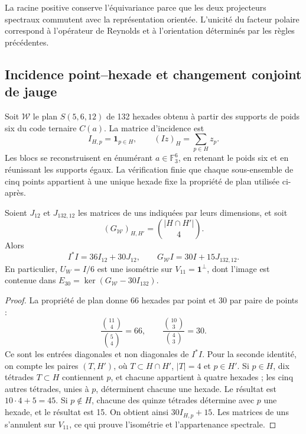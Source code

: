La racine positive conserve l’équivariance parce que les deux projecteurs
spectraux commutent avec la représentation orientée. L’unicité du
facteur polaire correspond à l’opérateur de Reynolds et à l’orientation
déterminés par les règles précédentes.

\subsection{Incidence point--hexade et changement conjoint de jauge}

Soit \(\mathcal W\) le plan \(S(5,6,12)\) de 132 hexades obtenu
à partir des supports de poids six du code ternaire \(C(a)\). La matrice
d’incidence est
\[
 I_{H,p}=\mathbf1_{p\in H},\qquad
 (Iz)_H=\sum_{p\in H}z_p.
\]
Les blocs se reconstruisent en énumérant \(a\in\mathbb F_3^6\),
en retenant le poids six et en réunissant les supports égaux. La vérification
finie que chaque sous-ensemble de cinq points appartient à une unique
hexade fixe la propriété de plan utilisée ci-après.

\begin{lemma}
\label{ii:lem:ii-witt-incidence-identities}
Soient \(J_{12}\) et \(J_{132,12}\) les matrices de uns indiquées par
leurs dimensions, et soit
\[
 (G_{\mathcal W})_{H,H'}=\binom{|H\cap H'|}{4}.
\]
Alors
\begin{equation}
 I^*I=36I_{12}+30J_{12},\qquad
 G_{\mathcal W}I=30I+15J_{132,12}.
 \label{ii:eq:ii-witt-incidence-identities}
\end{equation}
En particulier, \(U_W=I/6\) est une isométrie sur
\(V_{11}=\mathbf1^\perp\), dont l’image est contenue dans
\(E_{30}=\ker(G_{\mathcal W}-30I_{132})\).
\end{lemma}
\begin{proof}
La propriété de plan donne 66 hexades par point et 30 par paire de points :
\[
 \frac{\binom{11}{4}}{\binom54}=66,
 \qquad \frac{\binom{10}{3}}{\binom43}=30.
\]
Ce sont les entrées diagonales et non diagonales de \(I^*I\).
Pour la seconde identité, on compte les paires \((T,H')\), où
\(T\subset H\cap H'\), \(|T|=4\) et \(p\in H'\).
Si \(p\in H\), dix tétrades \(T\subset H\) contiennent \(p\),
et chacune appartient à quatre hexades ; les cinq autres tétrades,
unies à \(p\), déterminent chacune une hexade. Le résultat est
\(10\cdot4+5=45\). Si \(p\notin H\), chacune des quinze
tétrades détermine avec \(p\) une hexade, et le résultat est 15.
On obtient ainsi \(30I_{H,p}+15\). Les matrices de uns s’annulent sur
\(V_{11}\), ce qui prouve l’isométrie et l’appartenance spectrale.
\end{proof}

